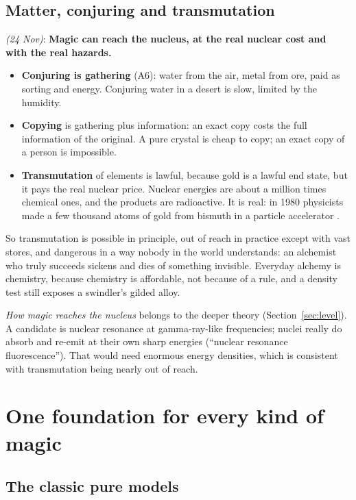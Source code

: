 \documentclass[11pt,a4paper]{article}
\newcommand{\decision}[3]{\par\smallskip\noindent{\color{dec}\textbf{Decision #1}} \textit{(#2)}: \textbf{#3}\par}
\begin{document}
\subsection{Matter, conjuring and transmutation}

\decision{Q5.2}{24 Nov}{Magic can reach the nucleus, at the real nuclear cost and with the real hazards.}

\begin{itemize}
  \item \textbf{Conjuring is gathering} (A6): water from the air, metal from ore, paid as sorting and energy. Conjuring water in a desert is slow, limited by the humidity.
  \item \textbf{Copying} is gathering plus information: an exact copy costs the full information of the original. A pure crystal is cheap to copy; an exact copy of a person is impossible.
  \item \textbf{Transmutation} of elements is lawful, because gold is a lawful end state, but it pays the real nuclear price. Nuclear energies are about a million times chemical ones, and the products are radioactive. It is real: in 1980 physicists made a few thousand atoms of gold from bismuth in a particle accelerator \cite{seaborg}.
\end{itemize}
So transmutation is possible in principle, out of reach in practice except with vast stores, and dangerous in a way nobody in the world understands: an alchemist who truly succeeds sickens and dies of something invisible. Everyday alchemy is chemistry, because chemistry is affordable, not because of a rule, and a density test still exposes a swindler's gilded alloy.

\textit{How magic reaches the nucleus} belongs to the deeper theory (Section~\ref{sec:level}). A candidate is nuclear resonance at gamma-ray-like frequencies; nuclei really do absorb and re-emit at their own sharp energies (``nuclear resonance fluorescence''). That would need enormous energy densities, which is consistent with transmutation being nearly out of reach.

\section{One foundation for every kind of magic}\label{sec:stack}

\subsection{The classic pure models}
\end{document}
